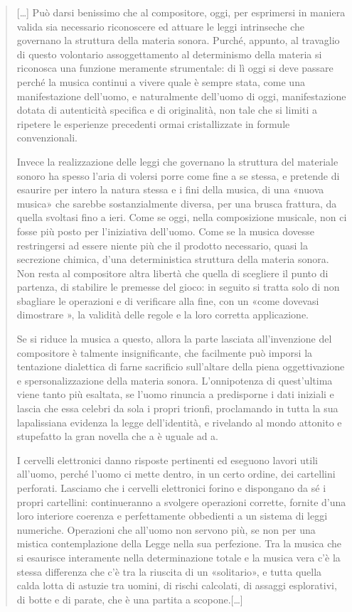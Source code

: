 \begin{quote}
[\ldots] Può darsi benissimo che al compositore, oggi, per esprimersi in maniera
valida sia necessario riconoscere ed attuare le leggi intrinseche che governano
la struttura della materia sonora. Purché, appunto, al travaglio di questo
volontario assoggettamento al determinismo della materia si riconosca una
funzione meramente strumentale: di lì oggi si deve passare perché la musica
continui a vivere quale è sempre stata, come una manifestazione dell’uomo, e
naturalmente dell’uomo di oggi, manifestazione dotata di autenticità specifica e
di originalità, non tale che si limiti a ripetere le esperienze precedenti
ormai cristallizzate in formule convenzionali.

Invece la realizzazione delle leggi che governano la struttura del materiale
sonoro ha spesso l’aria di volersi porre come fine a se stessa, e pretende di
esaurire per intero la natura stessa e i fini della musica, di una «nuova musica»
che sarebbe sostanzialmente diversa, per una brusca frattura, da quella svoltasi
fino a ieri. Come se oggi, nella composizione musicale, non ci fosse più posto
per l’iniziativa dell’uomo. Come se la musica dovesse restringersi ad essere
niente più che il prodotto necessario, quasi la secrezione chimica, d’una
deterministica struttura della materia sonora. Non resta al compositore altra
libertà che quella di scegliere il punto di partenza, di stabilire le premesse
del gioco: in seguito si tratta solo di non sbagliare le operazioni e di
verificare alla fine, con un «come dovevasi dimostrare », la validità delle
regole e la loro corretta applicazione.

Se si riduce la musica a questo, allora la parte lasciata all’invenzione del
compositore è talmente insignificante, che facilmente può imporsi la tentazione
dialettica di farne sacrificio sull’altare della piena oggettivazione e
spersonalizzazione della materia sonora. L’onnipotenza di quest’ultima viene
tanto più esaltata, se l’uomo rinuncia a predisporne i dati iniziali e lascia
che essa celebri da sola i propri trionfi, proclamando in tutta la sua
lapalissiana evidenza la legge dell’identità, e rivelando al mondo attonito e
stupefatto la gran novella che a è uguale ad a.

I cervelli elettronici danno risposte pertinenti ed eseguono lavori utili
all’uomo, perché l’uomo ci mette dentro, in un certo ordine, dei cartellini
perforati. Lasciamo che i cervelli elettronici forino e dispongano da sé i
propri cartellini: continueranno a svolgere operazioni corrette, fornite d’una
loro interiore coerenza e perfettamente obbedienti a un sistema di leggi
numeriche. Operazioni che all’uomo non servono più, se non per una mistica
contemplazione della Legge nella sua perfezione. Tra la musica che si esaurisce
interamente nella determinazione totale e la musica vera c’è la stessa
differenza che c’è tra la riuscita di un «solitario», e tutta quella calda
lotta di astuzie tra uomini, di rischi calcolati, di assaggi esplorativi, di
botte e di parate, che è una partita a scopone.[\ldots]
\end{quote}


